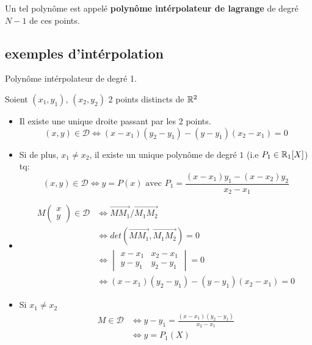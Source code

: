 \begin{definition}
    Un tel polynôme est appelé \textbf{polynôme intérpolateur de lagrange} de degré $N-1$ de ces points.
\end{definition}
\subsection{exemples d'intérpolation}
\begin{theorem}
    Polynôme intérpolateur de degré 1.
    \par
    Soient $(x_1, y_1), \, (x_2, y_2)$ 2 points distincts de $\mathbb{R}^2$
    \begin{itemize}
        \item Il existe une unique droite passant par les 2 points.
            \[
                (x, y) \in \mathcal{D} \iff (x-x_1)(y_2 - y_1) - (y - y_1)(x_2 - x_1) = 0
            \] 
        \item Si de plus, $x_1 \neq  x_2$, il existe un unique polynôme de degré $1$ (i.e $P_1 \in \mathbb{R}_1[X]$) tq:
            \[
                (x, y) \in \mathcal{D} \iff y = P(x) \text{ avec } P_1 = \frac{(x - x_1)y_1 - (x - x_2)y_2}{x_2 - x_1}
            \] 
    \end{itemize}
\end{theorem}
\begin{preuve}
    \begin{itemize}
        \item 
    \begin{align*}
        M \begin{pmatrix} x \\ y \end{pmatrix} \in \mathcal{D} &\iff \vec{MM_1} / \vec{M_1M_2}\\
                                                               &\iff det(\vec{MM_1}, \vec{M_1M_2}) = 0\\
                                                               &\iff \begin{vmatrix} x - x_1 & x_2 - x_1 \\ y - y_1 & y_2 - y_1 \end{vmatrix} = 0\\
                                                               &\iff (x - x_1)(y_2 - y_1) - (y - y_1)(x_2 - x_1) = 0
    \end{align*}
\item Si $x_1 \neq x_2$
    \begin{align*}
        M \in \mathcal{D} &\iff y - y_1 = \frac{(x - x_1)(y_2 - y_1)}{x_2 - x_1}\\
                          &\iff y = P_1(X)
    \end{align*}
\end{itemize}
\end{preuve}
